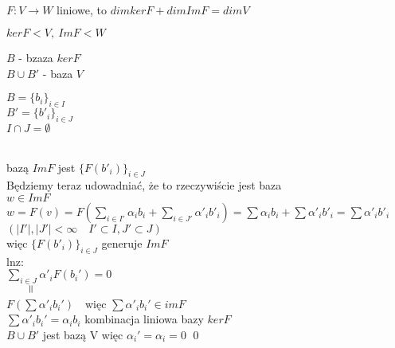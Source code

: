 \begin{tw}[o indeksie]
    ~\\
    $F: V \rightarrow W $ liniowe, to $dimker F + dimIm F = dim V$
\end{tw}
\begin{dd}
    $ker F < V,\  Im F < W$ \\
    \begin{minipage}[c]{0.5\textwidth}
        $B$ - bzaza $ker F$ \\
        $ B \cup B' $ - baza $V$
    \end{minipage}%
    \begin{minipage}[c]{0.5\textwidth}
        $B = \{b_i\}_{i \in I}$ \\
        $B' = \{b'_i\}_{i \in J}$ \\
        $I \cap J = \emptyset $
    \end{minipage} \\
    bazą $Im F$ jest $\{F(b'_i)\}_{i \in J}$ \\
    Będziemy teraz udowadniać, że to rzeczywiście jest baza\\
    $w \in Im F$ \\
    $w = F(v) = F(\sum\limits_{i \in I'} \alpha_i b_i + \sum\limits_{i \in J'} \alpha'_i b'_i) = \sum\alpha_i b_i + \sum\alpha'_i b'_i = \sum\alpha'_i b'_i $\\
    $(|I'|, |J'|<\infty \quad I'\subset I, J'\subset J)$\\
    więc $\{F(b'_i)\}_{i \in J} $ generuje $ImF$ \\
    lnz: \\
    $\sum\limits_{i\in J} \alpha'_i F(b_i') = 0$\\
    $\qquad \rotatebox{90}{$\,=$}$\\%
    $F(\sum \alpha'_i b_i') \quad $więc $ \sum \alpha'_i b_i' \in imF$\\
    $\sum \alpha'_i b_i' =\alpha_i b_i$ \quad kombinacja liniowa bazy $kerF$\\
    $B\cup B'$ jest bazą V więc $\alpha_i' = \alpha_i = 0$ \quad \qed
\end{dd} 

